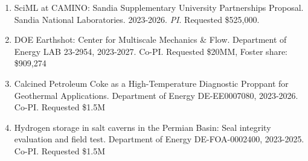 \begin{enumerate}
  \item SciML at CAMINO: Sandia Supplementary University Partnerships Proposal. Sandia National Laboratories. 2023-2026. \textit{PI}. Requested \$525,000.
\item DOE Earthshot: Center for Multiscale Mechanics \& Flow.  Department of Energy LAB 23-2954, 2023-2027. Co-PI. Requested \$20MM, Foster share: \$909,274
\item Calcined Petroleum Coke as a High-Temperature Diagnostic Proppant for Geothermal Applications.  Department of Energy DE-EE0007080, 2023-2026. Co-PI. Requested \$1.5M
\item Hydrogen storage in salt caverns in the Permian Basin:  Seal integrity evaluation and field test.  Department of Energy DE-FOA-0002400, 2023-2025. Co-PI. Requested \$1.5M
\end{enumerate}
